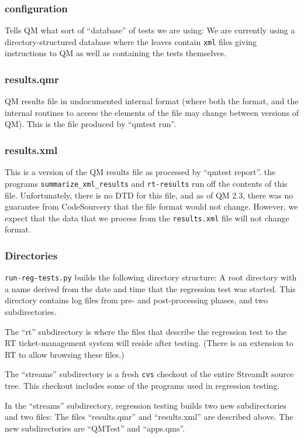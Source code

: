 \documentclass[11pt]{article}
\begin{document}
\subsubsection{configuration}
Tells QM what sort of ``database'' of tests we are using:  We are currently
using a directory-structured database where the leaves contain {\tt  xml} 
files giving instructions to QM as well as containing the tests themselves.

\subsubsection{results.qmr}
QM results file in undocumented internal format (where both the
format, and the internal routines to access the elements of the file
may change between versions of QM).  This is the file produced by
``qmtest run''.

\subsubsection{results.xml}
This is a version of the QM results file as processed by ``qmtest report''.
the programs {\tt summarize\_xml\_results} and {\tt rt-results} run off
the contents of this file.
Unfortunately, there is no DTD for this file, and as of QM 2.3, there
was no guarantee from CodeSourcery that the file format would not
change.
However, we expect that the data that we process from the {\tt results.xml}
file will not change format.

\subsubsection{Directories}
{\tt run-reg-tests.py} builds the following directory structure:
A root directory with a name derived from the date and time that the
regression test was started.
This directory contains log files from pre- and post-processing
phases, and two subdirectories.

The ``rt'' subdirectory is where the files that describe the
regression test to the RT ticket-management system will reside after
testing. (There is an extension to RT to allow browsing these files.)

The ``streams'' subdirectory is a fresh {\tt cvs} checkout of the
entire StreamIt source tree.  This checkout includes some of the
programs used in regression testing.

In the ``streams'' subdirectory, regression testing builds two new
subdirectories and two files:  The files ``results.qmr'' and
``results.xml'' are described above.
The new subdirectories are ``QMTest'' and ``apps.qms''.
\end{document}
